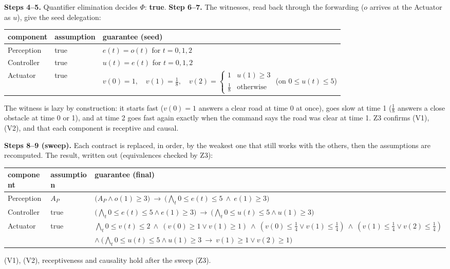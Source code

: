 \documentclass[10pt]{article}\usepackage[margin=0.75in]{geometry}\usepackage{amsmath,amssymb,booktabs}
\begin{document}
\textbf{Steps 4--5.} Quantifier elimination decides $\Phi$: \textbf{true}. \textbf{Step 6--7.} The witnesses, read back through the forwarding ($o$ arrives at the Actuator as $u$), give the seed delegation:
\begin{center}\begin{tabular}{@{}lll@{}}\toprule component & assumption & guarantee (seed)\\\midrule
Perception & true & $e(t)=o(t)$ for $t=0,1,2$\\
Controller & true & $u(t)=e(t)$ for $t=0,1,2$\\
Actuator & true & $v(0)=1,\quad v(1)=\tfrac18,\quad v(2)=\begin{cases}1&u(1)\ge3\\ \tfrac18&\text{otherwise}\end{cases}$ (on $0\le u(t)\le5$)\\\bottomrule\end{tabular}\end{center}
The witness is lazy by construction: it starts fast ($v(0)=1$ answers a clear road at time 0 at once), goes slow at time 1 ($\tfrac18$ answers a close obstacle at time 0 or 1), and at time 2 goes fast again exactly when the command says the road was clear at time 1. Z3 confirms (V1), (V2), and that each component is receptive and causal.

\textbf{Steps 8--9 (sweep).} Each contract is replaced, in order, by the weakest one that still works with the others, then the assumptions are recomputed. The result, written out (equivalences checked by Z3):
\begin{center}\begin{tabular}{@{}lll@{}}\toprule component & assumption & guarantee (final)\\\midrule
Perception & $A_P$ & $\big(A_P\wedge o(1)\ge3\big)\ \to\ \big(\textstyle\bigwedge_t 0\le e(t)\le5\ \wedge\ e(1)\ge3\big)$\\[2pt]
Controller & true & $\big(\textstyle\bigwedge_t 0\le e(t)\le5\wedge e(1)\ge3\big)\ \to\ \big(\textstyle\bigwedge_t 0\le u(t)\le5\wedge u(1)\ge3\big)$\\[2pt]
Actuator & true & $\textstyle\bigwedge_t 0\le v(t)\le2\ \wedge\ (v(0)\ge1\vee v(1)\ge1)\ \wedge\ (v(0)\le\tfrac14\vee v(1)\le\tfrac14)\ \wedge\ (v(1)\le\tfrac14\vee v(2)\le\tfrac14)$\\
 & & $\wedge\ \big(\textstyle\bigwedge_t 0\le u(t)\le5\wedge u(1)\ge3\ \to\ v(1)\ge1\vee v(2)\ge1\big)$\\\bottomrule\end{tabular}\end{center}
(V1), (V2), receptiveness and causality hold after the sweep (Z3).
\end{document}
